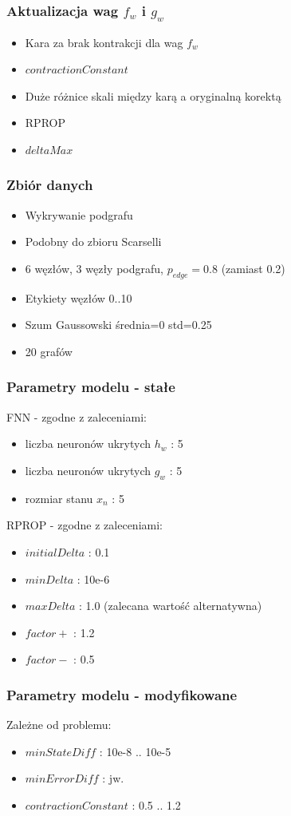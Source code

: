 \documentclass{beamer}
\begin{document}
\begin{frame}
\frametitle{Aktualizacja wag $f_w$ i $g_w$}
\begin{itemize}
	\item Kara za brak kontrakcji dla wag $f_w$
	\item $contractionConstant$
	\item Duże różnice skali między karą a oryginalną korektą
	\item RPROP
	\item $deltaMax$
\end{itemize}
\end{frame}

\begin{frame}
\frametitle{Zbiór danych}
\begin{itemize}
	\item Wykrywanie podgrafu
	\item Podobny do zbioru Scarselli
	\item 6 węzłów, 3 węzły podgrafu, $p_{edge} = 0.8$ (zamiast 0.2)
	\item Etykiety węzłów 0..10
	\item Szum Gaussowski średnia=0 std=0.25
	\item 20 grafów
\end{itemize}
\end{frame}

\begin{frame}
\frametitle{Parametry modelu - stałe}
FNN - zgodne z zaleceniami:
\begin{itemize}
	\item liczba neuronów ukrytych $h_w$ : 5
	\item liczba neuronów ukrytych $g_w$ : 5
	\item rozmiar stanu $x_n$ : 5
\end{itemize}
RPROP - zgodne z zaleceniami:
\begin{itemize}
	\item $initialDelta$ : 0.1
	\item $minDelta$ : 10e-6
	\item $maxDelta$ : 1.0 (zalecana wartość alternatywna)
	\item $factor+$ : 1.2
	\item $factor-$ : 0.5
\end{itemize}
\end{frame}

\begin{frame}
\frametitle{Parametry modelu - modyfikowane}
Zależne od problemu:
\begin{itemize}
	\item $minStateDiff$ : 10e-8 .. 10e-5
	\item $minErrorDiff$ : jw.
	\item $contractionConstant$ : 0.5 .. 1.2
\end{itemize}
\end{frame}
\end{document}
